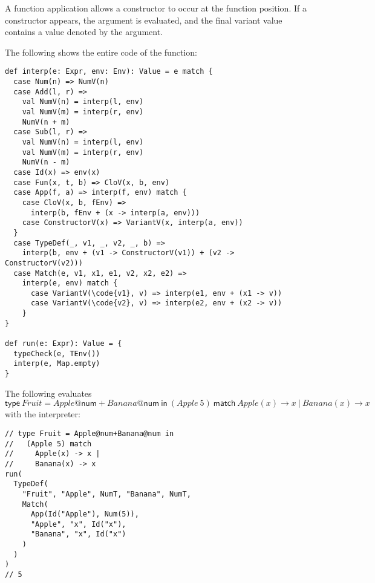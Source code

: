 A function application allows a constructor to occur at the function position.
If a constructor appears, the argument is evaluated, and the final variant value
contains a value denoted by the argument.

The following shows the entire code of the  function:

\begin{verbatim}
def interp(e: Expr, env: Env): Value = e match {
  case Num(n) => NumV(n)
  case Add(l, r) =>
    val NumV(n) = interp(l, env)
    val NumV(m) = interp(r, env)
    NumV(n + m)
  case Sub(l, r) =>
    val NumV(n) = interp(l, env)
    val NumV(m) = interp(r, env)
    NumV(n - m)
  case Id(x) => env(x)
  case Fun(x, t, b) => CloV(x, b, env)
  case App(f, a) => interp(f, env) match {
    case CloV(x, b, fEnv) =>
      interp(b, fEnv + (x -> interp(a, env)))
    case ConstructorV(x) => VariantV(x, interp(a, env))
  }
  case TypeDef(_, v1, _, v2, _, b) =>
    interp(b, env + (v1 -> ConstructorV(v1)) + (v2 -> ConstructorV(v2)))
  case Match(e, v1, x1, e1, v2, x2, e2) =>
    interp(e, env) match {
      case VariantV(\code{v1}, v) => interp(e1, env + (x1 -> v))
      case VariantV(\code{v2}, v) => interp(e2, env + (x2 -> v))
    }
}

def run(e: Expr): Value = {
  typeCheck(e, TEnv())
  interp(e, Map.empty)
}
\end{verbatim}

The following evaluates $\textsf{type}\
Fruit=Apple@\textsf{num}+Banana@\textsf{num}\ \textsf{in}\ (Apple\ 5)\
\textsf{match}\ Apple(x)\rightarrow x\ |\ Banana(x)\rightarrow x$ with the
interpreter:

\begin{verbatim}
// type Fruit = Apple@num+Banana@num in
//   (Apple 5) match
//     Apple(x) -> x |
//     Banana(x) -> x
run(
  TypeDef(
    "Fruit", "Apple", NumT, "Banana", NumT,
    Match(
      App(Id("Apple"), Num(5)),
      "Apple", "x", Id("x"),
      "Banana", "x", Id("x")
    )
  )
)
// 5
\end{verbatim}
